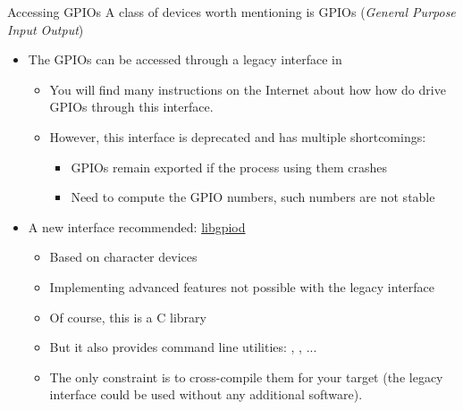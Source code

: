 \begin{frame}{Accessing GPIOs}
  A class of devices worth mentioning is GPIOs ({\em General Purpose Input Output})
  \begin{itemize}
  \item The GPIOs can be accessed through a legacy interface in
    \begin{itemize}
       \item You will find many instructions on the Internet about how
	     how do drive GPIOs through this interface.
       \item However, this interface is deprecated and has multiple
             shortcomings:
             \begin{itemize}
		\item GPIOs remain exported if the process using them crashes
		\item Need to compute the GPIO numbers, such numbers are not stable
	     \end{itemize}
    \end{itemize}
  \item A new interface recommended: \href{https://git.kernel.org/pub/scm/libs/libgpiod/libgpiod.git/}{libgpiod}
    \begin{itemize}
	\item Based on  character devices
        \item Implementing advanced features not possible with the legacy interface
	\item Of course, this is a C library
        \item But it also provides command line utilities:
              , , ...
	\item The only constraint is to cross-compile them for your target
	      (the legacy interface could be used without any additional software).
    \end{itemize}
  \end{itemize}
\end{frame}

